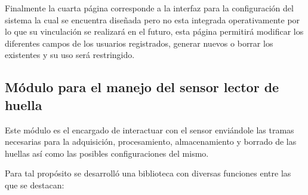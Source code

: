 Finalmente la cuarta página corresponde a la interfaz para la configuración del sistema la cual se encuentra diseñada pero no esta integrada operativamente por lo que su vinculación se realizará en el futuro, esta página permitirá modificar los diferentes campos de los usuarios registrados, generar nuevos o borrar los existentes y su uso será restringido.

\subsection{Módulo para el manejo del sensor lector de huella}

Este módulo es el encargado de interactuar con el sensor enviándole las tramas necesarias para la adquisición, procesamiento, almacenamiento y borrado de las huellas así como las posibles configuraciones del mismo.

Para tal propósito se desarrolló una biblioteca con diversas funciones entre las que se destacan:

